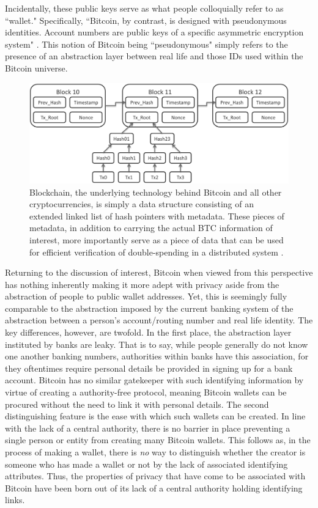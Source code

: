 \documentclass{article}
\begin{document}
Incidentally, these public keys serve as what people colloquially refer to as ``wallet." Specifically, ``Bitcoin, by contrast, is designed with pseudonymous identities. Account numbers are public keys of a specific asymmetric encryption system" \cite{laundering}. This notion of Bitcoin being ``pseudonymous" simply refers to the presence of an abstraction layer between real life and those IDs used within the Bitcoin universe.

\begin{figure}
    \label{fig:blockchain}
    \centering
    \includegraphics[width=.75\textwidth]{blockchain.png}
    \caption[Blockchain Data Structure]{Blockchain, the underlying technology behind Bitcoin and all other cryptocurrencies, is simply a data structure consisting of an extended linked list of hash pointers with metadata. These pieces of metadata, in addition to carrying the actual BTC information of interest, more importantly serve as a piece of data that can be used for efficient verification of double-spending in a distributed system \cite{blockchain-img}.}
\end{figure}

Returning to the discussion of interest, Bitcoin when viewed from this perspective has nothing inherently making it more adept with privacy aside from the abstraction of people to public wallet addresses. Yet, this is seemingly fully comparable to the abstraction imposed by the current banking system of the abstraction between a person's account/routing number and real life identity. The key differences, however, are twofold. In the first place, the abstraction layer instituted by banks are leaky. That is to say, while people generally do not know one another banking numbers, authorities within banks have this association, for they oftentimes require personal details be provided in signing up for a bank account. Bitcoin has no similar gatekeeper with such identifying information by virtue of creating a authority-free protocol, meaning Bitcoin wallets can be procured without the need to link it with personal details. The second distinguishing feature is the ease with which such wallets can be created. In line with the lack of a central authority, there is no barrier in place preventing a single person or entity from creating many Bitcoin wallets. This follows as, in the process of making a wallet, there is \textit{no} way to distinguish whether the creator is someone who has made a wallet or not by the lack of associated identifying attributes. Thus, the properties of privacy that have come to be associated with Bitcoin have been born out of its lack of a central authority holding identifying links. 
\end{document}
